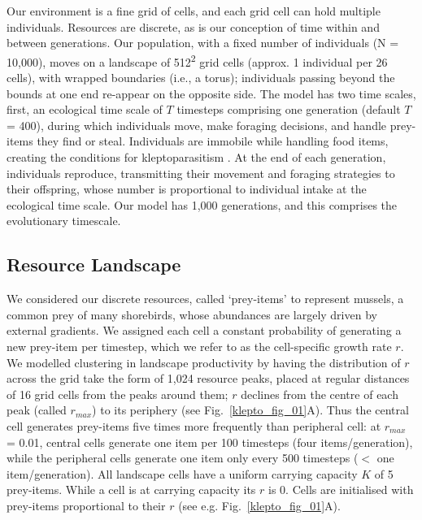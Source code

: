 Our environment is a fine grid of cells, and each grid cell can hold multiple individuals.
Resources are discrete, as is our conception of time within and between generations. 
Our population, with a fixed number of individuals (N = 10,000), moves on a landscape of 512\textsuperscript{2} grid cells (approx. 1 individual per 26 cells), with wrapped boundaries (i.e., a torus); individuals passing beyond the bounds at one end re-appear on the opposite side.
The model has two time scales, first, an ecological time scale of $T$ timesteps comprising one generation (default $T$ = 400), during which individuals move, make foraging decisions, and handle prey-items they find or steal.
Individuals are immobile while handling food items, creating the conditions for kleptoparasitism \parencite{brockmann1979,ruxton1992}.
At the end of each generation, individuals reproduce, transmitting their movement and foraging strategies to their offspring, whose number is proportional to individual intake at the ecological time scale.
Our model has 1,000 generations, and this comprises the evolutionary timescale.

\subsection*{Resource Landscape}

We considered our discrete resources, called `prey-items' to represent mussels, a common prey of many shorebirds, whose abundances are largely driven by external gradients.
We assigned each cell a constant probability of generating a new prey-item per timestep, which we refer to as the cell-specific growth rate $r$.
We modelled clustering in landscape productivity by having the distribution of $r$ across the grid take the form of 1,024 resource peaks, placed at regular distances of 16 grid cells from the peaks around them; $r$ declines from the centre of each peak (called $r_{max}$) to its periphery (see Fig.~\ref{klepto_fig_01}A).
Thus the central cell generates prey-items five times more frequently than peripheral cell: at $r_{max}$ = 0.01, central cells generate one item per 100 timesteps (four items/generation), while the peripheral cells generate one item only every 500 timesteps ($<$ one item/generation).
All landscape cells have a uniform carrying capacity $K$ of 5 prey-items.
While a cell is at carrying capacity its $r$ is 0.
Cells are initialised with prey-items proportional to their $r$ (see e.g. Fig.~\ref{klepto_fig_01}A).

